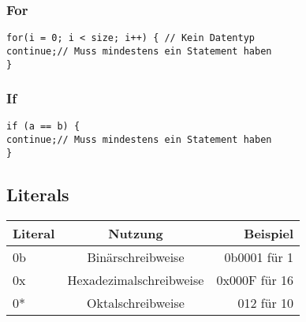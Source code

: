 \documentclass{article}
\begin{document}
\subsubsection*{For}
\begin{verbatim}
for(i = 0; i < size; i++) { // Kein Datentyp
continue;// Muss mindestens ein Statement haben
}
\end{verbatim}
\subsubsection*{If}
\begin{verbatim}
if (a == b) {
continue;// Muss mindestens ein Statement haben
}
\end{verbatim}

\subsection{Literals}
\begin{center}
\begin{tabular}{| l | c | r |}
	\hline
	\textbf{Literal} & \textbf{Nutzung} &  \textbf{Beispiel} \\ \hline
    0b & Binärschreibweise & 0b0001 für 1\\
    0x & Hexadezimalschreibweise & 0x000F für 16\\
	0* & Oktalschreibweise & 012 für 10\\
	\hline
\end{tabular}
\end{center}
\end{document}
